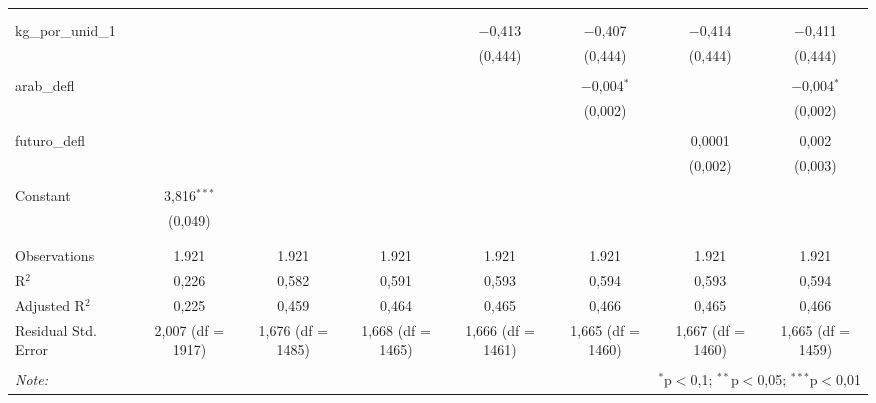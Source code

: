 \begin{table}[!htbp]
\begin{tabular}{@{\extracolsep{5pt}}lccccccc}
  &  &  &  &  &  &  &  \\ 
  & & & & & & & \\ 
 kg\_por\_unid\_1 &  &  &  & $-$0,413 & $-$0,407 & $-$0,414 & $-$0,411 \\ 
  &  &  &  & (0,444) & (0,444) & (0,444) & (0,444) \\ 
  & & & & & & & \\ 
 arab\_defl &  &  &  &  & $-$0,004$^{*}$ &  & $-$0,004$^{*}$ \\ 
  &  &  &  &  & (0,002) &  & (0,002) \\ 
  & & & & & & & \\ 
 futuro\_defl &  &  &  &  &  & 0,0001 & 0,002 \\ 
  &  &  &  &  &  & (0,002) & (0,003) \\ 
  & & & & & & & \\ 
 Constant & 3,816$^{***}$ &  &  &  &  &  &  \\ 
  & (0,049) &  &  &  &  &  &  \\ 
  & & & & & & & \\ 
\hline \\[-1.8ex] 
Observations & 1.921 & 1.921 & 1.921 & 1.921 & 1.921 & 1.921 & 1.921 \\ 
R$^{2}$ & 0,226 & 0,582 & 0,591 & 0,593 & 0,594 & 0,593 & 0,594 \\ 
Adjusted R$^{2}$ & 0,225 & 0,459 & 0,464 & 0,465 & 0,466 & 0,465 & 0,466 \\ 
Residual Std. Error & 2,007 (df = 1917) & 1,676 (df = 1485) & 1,668 (df = 1465) & 1,666 (df = 1461) & 1,665 (df = 1460) & 1,667 (df = 1460) & 1,665 (df = 1459) \\ 
\hline 
\hline \\[-1.8ex] 
\textit{Note:}  & \multicolumn{7}{r}{$^{*}$p$<$0,1; $^{**}$p$<$0,05; $^{***}$p$<$0,01} \\ 
\end{tabular} 
\end{table} 
